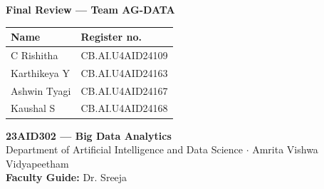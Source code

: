 \documentclass[aspectratio=169,10pt]{beamer}
\begin{document}
\begin{frame}[plain]
  \vspace{0.3cm}
  \begin{center}

    \vspace{0.4cm}
    {\large\bfseries Final Review --- Team AG-DATA}

    \vspace{0.35cm}
    \begin{tabular}{ll}
      \textbf{Name} & \textbf{Register no.} \\
      \midrule
      C Rishitha   & CB.AI.U4AID24109 \\
      Karthikeya Y & CB.AI.U4AID24163 \\
      Ashwin Tyagi & CB.AI.U4AID24167 \\
      Kaushal S    & CB.AI.U4AID24168 \\
    \end{tabular}

    \vspace{0.45cm}
    {\small\textbf{23AID302 --- Big Data Analytics}}\\[0.15em]
    {\footnotesize Department of Artificial Intelligence and Data Science $\cdot$ Amrita Vishwa Vidyapeetham}\\[0.15em]
    {\footnotesize\textbf{Faculty Guide:} Dr. Sreeja}
  \end{center}
\end{frame}
\end{document}
